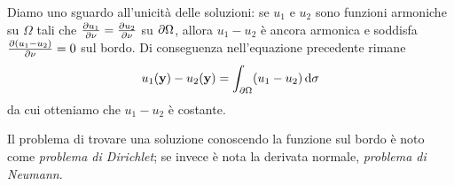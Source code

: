 Diamo uno sguardo all'unicità delle soluzioni: se $u_1$ e $u_2$ sono funzioni armoniche su $\Omega$ tali che $\frac{\partial {u_1}}{\partial {\nu}}=\frac{\partial {u_2}}{\partial {\nu}}$ su $\partial\Omega$, allora $u_1-u_2$ è ancora armonica e soddisfa $\frac{\partial {(u_1-u_2)}}{\partial {\nu}}=0$ sul bordo.
Di conseguenza nell'equazione precedente rimane
\begin{equation}
    u_1(\mathbf{y})-u_2(\mathbf{y})=\int_{\partial\Omega}(u_1-u_2)\,\textup{d}\sigma
\end{equation}
da cui otteniamo che $u_1-u_2$ è costante.

Il problema di trovare una soluzione conoscendo la funzione sul bordo è noto come \emph{problema di Dirichlet}; se invece è nota la derivata normale, \emph{problema di Neumann}.

